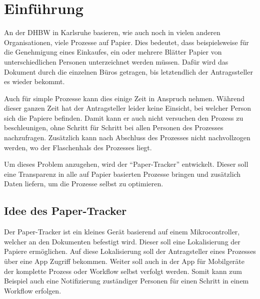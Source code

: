 \chapter{Einführung}

An der \gls{DHBW} in Karlsruhe basieren, wie auch noch in vielen anderen Organisationen, viele Prozesse auf Papier.
Dies bedeutet, dass beispielsweise für die Genehmigung eines Einkaufes, ein oder mehrere Blätter Papier von unterschiedlichen Personen unterzeichnet werden müssen.
Dafür wird das Dokument durch die einzelnen Büros getragen, bis letztendlich der Antragssteller es wieder bekommt.

Auch für simple Prozesse kann dies einige Zeit in Anspruch nehmen.
Während dieser ganzen Zeit hat der Antragsteller leider keine Einsicht, bei welcher Person sich die Papiere befinden.
Damit kann er auch nicht versuchen den Prozess zu beschleunigen, ohne Schritt für Schritt bei allen Personen des Prozesses nachzufragen.
Zusätzlich kann nach Abschluss des Prozesses nicht nachvollzogen werden, wo der Flaschenhals des Prozesses liegt.

Um dieses Problem anzugehen, wird der \enquote{Paper-Tracker} entwickelt.
Dieser soll eine Transparenz in alle auf Papier basierten Prozesse bringen und zusätzlich Daten liefern, um die Prozesse selbst zu optimieren.

\section{Idee des Paper-Tracker}

Der Paper-Tracker ist ein kleines Gerät basierend auf einem Mikrocontroller, welcher an den Dokumenten befestigt wird.
Dieser soll eine Lokalisierung der Papiere ermöglichen.
Auf diese Lokalisierung soll der Antragsteller eines Prozesses über eine App Zugriff bekommen.
Weiter soll auch in der App für Mobilgeräte der komplette Prozess oder Workflow selbst verfolgt werden.
Somit kann zum Beispiel auch eine Notifizierung zuständiger Personen für einen Schritt in einem Workflow erfolgen.
